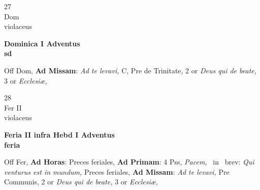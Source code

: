 \documentclass[10pt, openany]{book}
\begin{document}
        \begin{center}
            \begin{minipage}{3.5in}
                \vspace{2em}
                \begin{minipage}{0.5in}
                    {\Huge 27} \\
                    {\normalsize Dom} \\
                    {\normalsize violaceus}
                \end{minipage}
                \begin{minipage}{3.0in}
                    \textbf{ \large Dominica I Adventus \\
                    \textnormal{\normalsize sd}} \\ 
                \end{minipage}
                \begin{justify}Off Dom, \textbf{Ad Missam}: \textit{Ad te levavi,} C, Pre de Trinitate, 2 or \textit{Deus qui de beate,} 3 or \textit{Ecclesiæ,}   
                \end{justify}
            \end{minipage}
        \end{center}
    
        \begin{center}
            \begin{minipage}{3.5in}
                \vspace{2em}
                \begin{minipage}{0.5in}
                    {\Huge 28} \\
                    {\normalsize Fer II} \\
                    {\normalsize violaceus}
                \end{minipage}
                \begin{minipage}{3.0in}
                    \textbf{ \large Feria II infra Hebd I Adventus \\
                    \textnormal{\normalsize feria}} \\ 
                \end{minipage}
                \begin{justify}Off Fer, \textbf{Ad Horas}: Preces feriales, \textbf{Ad Primam}: 4 Pss, \textit{Pacem,} \Vbar\ in \Rbar\ brev: \textit{Qui venturus est in mundum,} Preces feriales, \textbf{Ad Missam}: \textit{Ad te levavi,} Pre Communis, 2 or \textit{Deus qui de beate,} 3 or \textit{Ecclesiæ,}   
                \end{justify}
            \end{minipage}
        \end{center}
    
\end{document}
